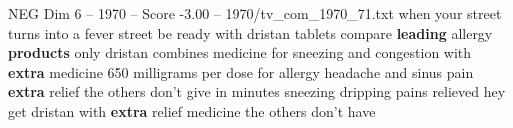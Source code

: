 \begin{textsample}{NEG Dim 6 – 1970 – Score -3.00 – 1970/tv\_com\_1970\_71.txt}  \label{ex:f6_neg_061}
when your street turns into a fever street be ready with dristan tablets compare \textbf{leading} allergy \textbf{products} only dristan combines medicine for sneezing and congestion with \textbf{extra} medicine 650 milligrams per dose for allergy headache and sinus pain \textbf{extra} relief the others don't give in minutes sneezing dripping pains relieved hey get dristan with \textbf{extra} relief medicine the others don't have

\end{textsample}
